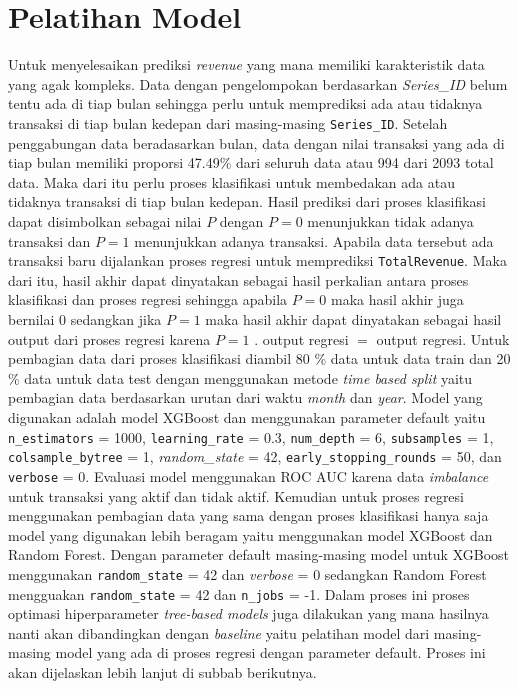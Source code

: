     \section{Pelatihan Model \method}\label{sec:method construction}
    Untuk menyelesaikan prediksi \textit{revenue} yang mana memiliki karakteristik data yang agak kompleks. Data dengan pengelompokan berdasarkan \textit{Series\_ID} belum tentu ada di tiap bulan sehingga perlu untuk memprediksi ada atau tidaknya transaksi di tiap bulan kedepan dari masing-masing \texttt{Series\_ID}. Setelah penggabungan data beradasarkan bulan, data dengan nilai transaksi yang ada di tiap bulan memiliki proporsi 47.49\% dari seluruh data atau 994 dari 2093 total data. Maka dari itu perlu proses klasifikasi untuk membedakan ada atau tidaknya transaksi di tiap bulan kedepan. Hasil prediksi dari proses klasifikasi dapat disimbolkan sebagai nilai $P$ dengan $P = 0$ menunjukkan tidak adanya transaksi dan $P=1$ menunjukkan adanya transaksi. Apabila data tersebut ada transaksi baru dijalankan proses regresi untuk memprediksi \texttt{TotalRevenue}. Maka dari itu, hasil akhir dapat dinyatakan sebagai hasil perkalian antara proses klasifikasi dan proses regresi sehingga apabila $P = 0$ maka hasil akhir juga bernilai 0 sedangkan jika $P = 1$ maka hasil akhir dapat dinyatakan sebagai hasil output dari proses regresi karena $P = 1$ $.$ output regresi $=$ output regresi. 
    Untuk pembagian data dari proses klasifikasi diambil 80 \% data untuk data train dan 20 \% data untuk data test dengan menggunakan metode \textit{time based split} yaitu pembagian data berdasarkan urutan dari waktu \textit{month} dan \textit{year}. Model yang digunakan adalah model XGBoost dan menggunakan parameter default yaitu \texttt{n\_estimators} = 1000, \texttt{learning\_rate} = 0.3, \texttt{num\_depth} = 6,  \texttt{subsamples} = 1, \texttt{colsample\_bytree} = 1, \textit{random\_state} = 42, \texttt{early\_stopping\_rounds} = 50, dan \texttt{verbose} = 0. Evaluasi model menggunakan ROC AUC karena data \textit{imbalance} untuk transaksi yang aktif dan tidak aktif. Kemudian untuk proses regresi menggunakan pembagian data yang sama dengan proses klasifikasi hanya saja model yang digunakan lebih beragam yaitu menggunakan model XGBoost dan Random Forest. Dengan parameter default masing-masing model untuk XGBoost menggunakan \texttt{random\_state} = 42 dan \textit{verbose} = 0 sedangkan Random Forest mengguakan \texttt{random\_state} = 42 dan \texttt{n\_jobs} = -1. Dalam proses ini proses optimasi hiperparameter \textit{tree-based models} juga dilakukan yang mana hasilnya nanti akan dibandingkan dengan \textit{baseline} yaitu pelatihan model dari masing-masing model yang ada di proses regresi dengan parameter default. Proses ini akan dijelaskan lebih lanjut di subbab berikutnya. 

